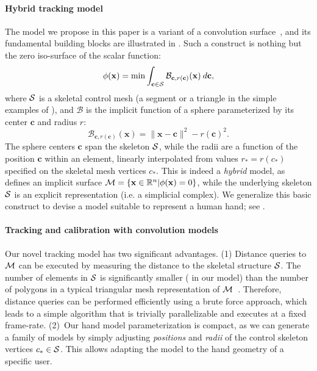 

\paragraph{Hybrid tracking model}
The model we propose in this paper is a variant of a convolution surface~\cite{bloomenthal1991convolution}, and its fundamental building blocks are illustrated in . Such a construct is nothing but the zero iso-surface of the scalar function:
\begin{equation}
\phi(\mathbf{x}) = \min \int_{\mathbf{c} \in \mathcal{S}} \mathcal{B}_{\mathbf{c}, r(\mathbf{c})}(\mathbf{x}) \: d\mathbf{c},
\label{eq:convsurf}
\end{equation}
where $\mathcal{S}$ is a skeletal control mesh (a segment or a triangle in the simple examples of ), and $\mathcal{B}$ is the implicit function of a sphere parameterized by its center $\mathbf{c}$ and radius $r$:
\begin{equation}
\mathcal{B}_{\mathbf{c}, r(\mathbf{c})}(\mathbf{x}) = \|\mathbf{x}-\mathbf{c}\|^2 - r(\mathbf{c})^2.
\end{equation}
The sphere centers $\mathbf{c}$ span the skeleton $\mathcal{S}$, while the radii are a function of the position $\mathbf{c}$ within an element, linearly interpolated from values $r_*=r(c_*)$ specified on the skeletal mesh vertices $c_*$. This is indeed a \emph{hybrid} model, as  defines an implicit surface $\mathcal{M} = \{\mathbf{x} \in \mathbb{R}^n | \phi(\mathbf{x})=0 \}$, while the underlying skeleton $\mathcal{S}$ is an explicit representation (i.e. a simplicial complex). We generalize this basic construct to devise a model suitable to represent a human hand; see .


\paragraph{Tracking and calibration with convolution models}
Our novel tracking model has two significant advantages. (1) Distance queries to $\mathcal{M}$ can be executed by measuring the distance to the skeletal structure $\mathcal{S}$. The number of elements in $\mathcal{S}$ is significantly smaller ( in our model) than the number of polygons in a typical triangular mesh representation of $\mathcal{M}$~\cite{thiery2013sphere}. 
Therefore, distance queries can be performed efficiently using a brute force approach, which leads to a simple algorithm that is trivially parallelizable and executes at a fixed frame-rate. (2)~Our hand model parameterization is compact, as we can generate a family of models by simply adjusting \emph{positions} and \emph{radii} of the control skeleton vertices $c_* \in \mathcal{S}$. This allows adapting the model to the hand geometry of a specific user.

